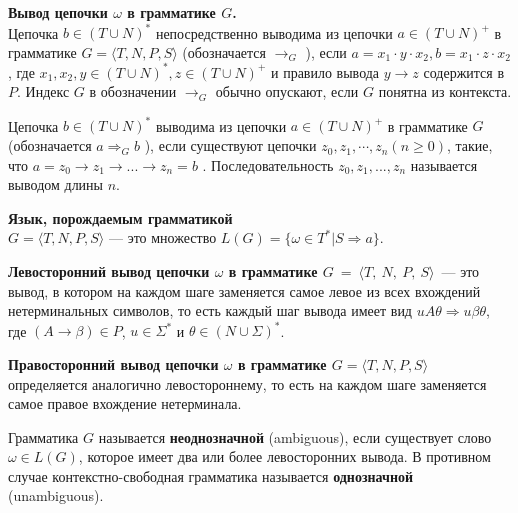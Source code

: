 \begin{mydef}    
    \textbf{Вывод цепочки $\omega$ в грамматике $G$.}\\  Цепочка $b \in  ( T \cup  N )^*$ непосредственно выводима из цепочки   $a \in ( T \cup N )^+$ в грамматике $G=\langle T, N, P, S \rangle$  (обозначается  $\rightarrow_G$ ), если  $a = x_1 \cdot y \cdot x_2, b = x_1 \cdot z \cdot x_2$, где $x_1, x_2, y \in   (T \cup N )^*, z \in  (T \cup N )^+$ и правило вывода  $y \rightarrow z$  содержится в $P$. Индекс $G$ в обозначении $\rightarrow_G$ обычно опускают, если $G$ понятна из контекста.

Цепочка $b \in  (T \cup  N )^*$  выводима из цепочки  $a \in (T \cup  N)^+$ в грамматике $G$  (обозначается  $a \Rightarrow_G b$ ), если существуют цепочки $z_0, z_1, \cdots, z_n  (n \geq 0)$, такие, что $a = z_0 \rightarrow z_1 \rightarrow ... \rightarrow z_n = b$ . Последовательность $z_0, z_1, ..., z_n$ называется выводом длины $n$.
\end{mydef}

\begin{mydef}
    \textbf{Язык, порождаемым грамматикой \\ $G = \langle T, N, P, S \rangle$} --- это множество $L(G)  = \{ \omega \in T^* | S \Rightarrow a \}$.
\end{mydef}

\begin{mydef}
    \textbf{Левосторонний вывод цепочки $\omega$ в грамматике  $G~=~\langle T,~N,~P,~S \rangle$}~--- это вывод, в котором на каждом шаге заменяется самое левое из всех вхождений нетерминальных символов, то есть каждый шаг вывода имеет вид $u A \theta \Rightarrow u \beta \theta$, где $( A \rightarrow \beta ) \in P$, $u \in \Sigma ^*$ и $\theta \in (N \cup \Sigma)^* $.
\end{mydef}

\begin{mydef}    
    \textbf{Правосторонний вывод цепочки $\omega$ в грамматике $G=\langle  T, N, P, S  \rangle$} определяется аналогично левостороннему, то есть на каждом шаге заменяется самое правое вхождение нетерминала.
\end{mydef}

\begin{mydef}    
    Грамматика $G$ называется \textbf{неоднозначной} (ambiguous), если существует слово $\omega \in L(G)$, которое имеет два или более левосторонних вывода. В противном случае контекстно-свободная грамматика называется \textbf{однозначной} (unambiguous). 
\end{mydef}

